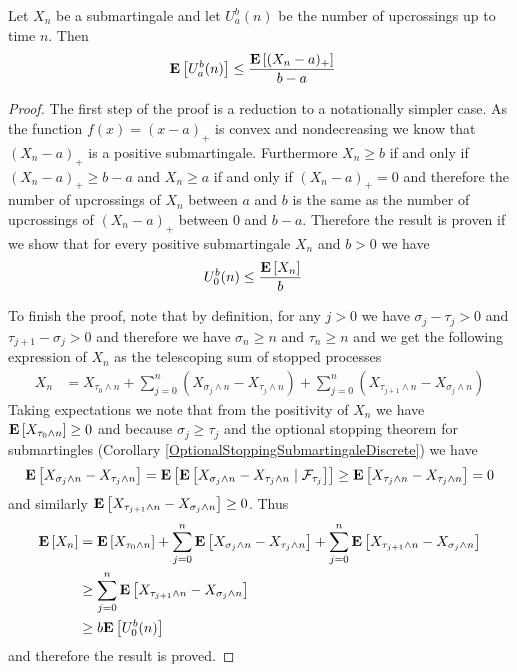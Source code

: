 \begin{lem}\label{UpcrossingInequalityDiscrete}Let $X_n$ be a
  submartingale and let $U_a^b(n)$ be the number of upcrossings up to
  time $n$.  Then
\begin{align*}
\expectation{U_a^b(n)} &\leq \frac{\expectation{(X_n-a)_+}}{b-a}
\end{align*}
\end{lem}
\begin{proof}
The first step of the proof is a reduction to a notationally simpler
case.  As the function $f(x) = (x -a)_+$ is convex and nondecreasing we know
that $(X_n - a)_+$ is a positive submartingale.  Furthermore $X_n \geq b$ if
and only if $(X_n - a)_+ \geq b-a$ and $X_n \geq a$ if and only if
$(X_n -a)_+ = 0$ and therefore the number of upcrossings of $X_n$
between $a$ and $b$ is the same as the number of upcrossings of $(X_n
- a)_+$ between $0$ and $b-a$.  Therefore the result is proven if we
show that for every positive submartingale $X_n$ and $b>0$ we have 
\begin{align*}
U_0^b (n) &\leq \frac{\expectation{X_n}}{b}
\end{align*}

To finish the proof, note that by definition, for any $j>0$ we have $\sigma_j -
\tau_j > 0$ and $\tau_{j+1} - \sigma_j > 0$ and therefore we have
$\sigma_n \geq n$ and $\tau_n \geq n$ and we get the following
expression of $X_n$ as the telescoping sum of stopped processes
\begin{align*}
X_n &= X_{\tau_0 \wedge n} + \sum_{j=0}^n \left ( X_{\sigma_j \wedge n} - X_{\tau_j
    \wedge n} \right) + \sum_{j=0}^n \left ( X_{\tau_{j+1} \wedge n} - X_{\sigma_j
    \wedge n} \right)
\end{align*}
Taking expectations we note that from the positivity of $X_n$ we have
$\expectation{X_{\tau_0 \wedge n}}\geq 0$ and because $\sigma_j \geq
\tau_j$ and the optional stopping theorem for submartingles
(Corollary \ref{OptionalStoppingSubmartingaleDiscrete}) we have
\begin{align*}
\expectation{X_{\sigma_j \wedge n} - X_{\tau_j    \wedge n} } &=
\expectation{\cexpectationlong{\mathcal{F}_{\tau_j}}{X_{\sigma_j \wedge n}
    - X_{\tau_j    \wedge n}}} 
\geq \expectation{X_{\tau_j \wedge n}
    - X_{\tau_j    \wedge n}} = 0\\
\end{align*}
and similarly $\expectation{X_{\tau_{j+1} \wedge n} - X_{\sigma_j
    \wedge n} } \geq 0$.   Thus
\begin{align*}
\expectation{X_n} &= \expectation{X_{\tau_0 \wedge n}} + 
\sum_{j=0}^n \expectation{ X_{\sigma_j \wedge n} - X_{\tau_j \wedge n}} + 
\sum_{j=0}^n \expectation{X_{\tau_{j+1} \wedge n} - X_{\sigma_j \wedge n}} \\
&\geq \sum_{j=0}^n \expectation{X_{\tau_{j+1} \wedge n} - X_{\sigma_j \wedge n}} \\
&\geq b \expectation{U_0^b(n)}
\end{align*}
and therefore the result is proved.
\end{proof}

